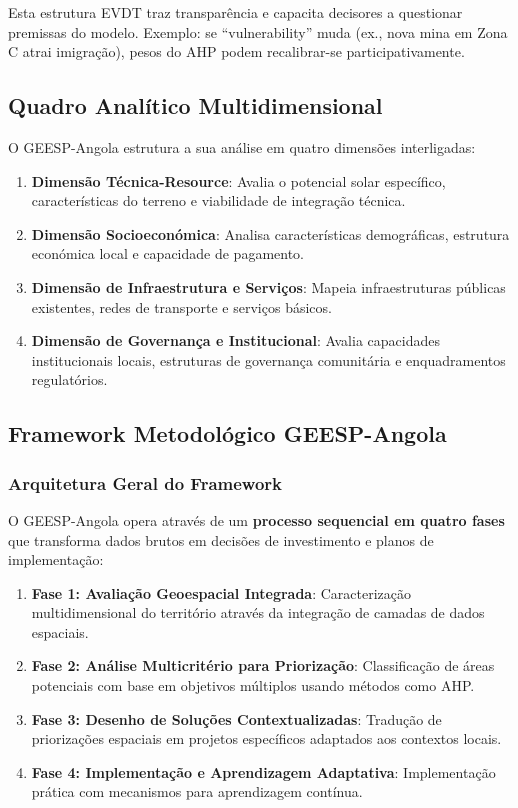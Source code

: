 \documentclass[12pt, a4paper]{article}
\begin{document}
\begin{itemize}
Esta estrutura EVDT traz transparência e capacita decisores a questionar premissas do modelo. Exemplo: se ``vulnerability'' muda (ex., nova mina em Zona C atrai imigração), pesos do AHP podem recalibrar-se participativamente.

\subsection{Quadro Analítico Multidimensional}

O GEESP-Angola estrutura a sua análise em quatro dimensões interligadas:
\begin{enumerate}
\item \textbf{Dimensão Técnica-Resource}: Avalia o potencial solar específico, características do terreno e viabilidade de integração técnica.
\item \textbf{Dimensão Socioeconómica}: Analisa características demográficas, estrutura económica local e capacidade de pagamento.
\item \textbf{Dimensão de Infraestrutura e Serviços}: Mapeia infraestruturas públicas existentes, redes de transporte e serviços básicos.
\item \textbf{Dimensão de Governança e Institucional}: Avalia capacidades institucionais locais, estruturas de governança comunitária e enquadramentos regulatórios.
\end{enumerate}

\subsection{Framework Metodológico GEESP-Angola}

\subsubsection{Arquitetura Geral do Framework}

O GEESP-Angola opera através de um \textbf{processo sequencial em quatro fases} que transforma dados brutos em decisões de investimento e planos de implementação:

\begin{enumerate}
\item \textbf{Fase 1: Avaliação Geoespacial Integrada}: Caracterização multidimensional do território através da integração de camadas de dados espaciais.
\item \textbf{Fase 2: Análise Multicritério para Priorização}: Classificação de áreas potenciais com base em objetivos múltiplos usando métodos como AHP.
\item \textbf{Fase 3: Desenho de Soluções Contextualizadas}: Tradução de priorizações espaciais em projetos específicos adaptados aos contextos locais.
\item \textbf{Fase 4: Implementação e Aprendizagem Adaptativa}: Implementação prática com mecanismos para aprendizagem contínua.
\end{enumerate}


\end{itemize}
\end{document}
